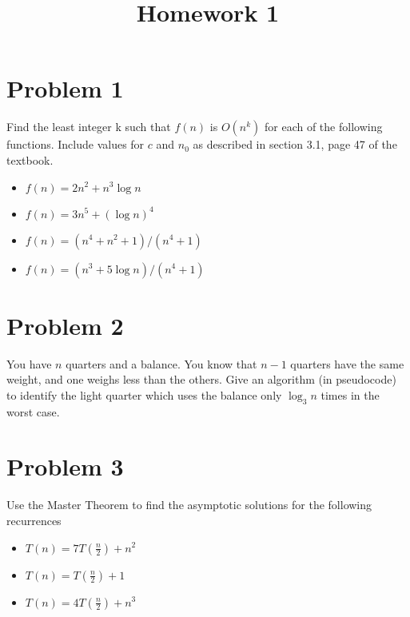 \documentclass{article}
\title{Homework 1}
\date{}
\begin{document}
\maketitle %

\section*{Problem 1}
Find the least integer k such that $f(n)$ is $O(n^k)$ for each of the following
functions. Include values for $c$ and $n_0$ as described in section 3.1, page 47 of the textbook.
\begin{itemize}
\item$f(n) = 2n^2 + n^3\log n$
\item$f(n) = 3n^5 + (\log n)^4$
\item$f(n) = (n^4 + n^2 + 1)/(n^4 + 1)$
\item$f(n) = (n^3 + 5 \log n)/(n^4 + 1)$
\end{itemize}


\section*{Problem 2}
You have $n$ quarters and a balance. You know that $n-1$ quarters have
the same weight, and one weighs less than the others. Give an algorithm
(in pseudocode) to identify the light quarter which uses the balance only
$\log_{3}n$ times in the worst case.


\section*{Problem 3}
Use the Master Theorem to find the asymptotic solutions for the following recurrences

\begin{itemize}
\item $T(n) = 7T(\frac{n}{2}) + n^2$
\item $T(n) = T (\frac{n}{2}) + 1$
\item $T(n) = 4T(\frac{n}{2}) + n^3$
\end{itemize}
\end{document}
